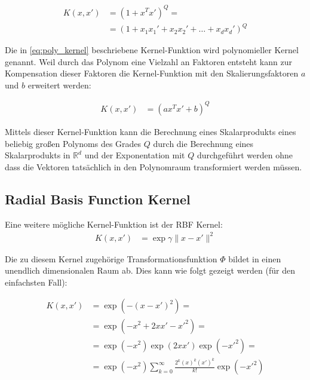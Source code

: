 \documentclass[a4paper,11pt,twoside]{scrreprt}
\newcommand{\norm}[1]{\lVert#1\rVert}
\begin{document}
\begin{equation} \label{eq:poly_kernel}
	\begin{aligned}
		K(x, x') &= (1 + x^{T}x')^{Q} = \\
		&= (1 + x_{1} x_{1}' + x_{2} x_{2}' + \dots + x_{d} x_{d}')^{Q}
	\end{aligned}
\end{equation}

Die in \autoref{eq:poly_kernel} beschriebene Kernel-Funktion wird polynomieller Kernel genannt. Weil durch das Polynom eine Vielzahl an Faktoren entsteht kann zur Kompensation dieser Faktoren die Kernel-Funktion mit den Skalierungsfaktoren $a$ und $b$ erweitert werden:

  \begin{equation} \label{eq:poly_kernel2}
  	\begin{aligned}
  		K(x, x') &= (a x^{T}x' + b)^{Q}
  	\end{aligned}
  \end{equation}

Mittels dieser Kernel-Funktion kann die Berechnung eines Skalarprodukts eines beliebig großen Polynoms des Grades $Q$ durch die Berechnung eines Skalarprodukts in $\mathbb{R}^{d}$ und der Exponentation mit $Q$ durchgeführt werden ohne dass die Vektoren tatsächlich in den Polynomraum transformiert werden müssen.  

\subsection{Radial Basis Function Kernel}

Eine weitere mögliche Kernel-Funktion ist der \ac{RBF} Kernel:
\begin{equation} \label{eq:rbfk}
	\begin{aligned}
		K(x, x') &= \exp{\gamma \norm{x - x'}^2}
	\end{aligned}
\end{equation}

Die zu diesem Kernel zugehörige Transformationsfunktion $\Phi$ bildet in einen unendlich dimensionalen Raum ab. Dies kann wie folgt gezeigt werden (für den einfachsten Fall):

\begin{equation} \label{eq:proof_rbfk_infinite}
	\begin{aligned}
		K(x, x') &= \exp{(-(x - x')^{2})} =\\
		&= \exp{(-x^{2} + 2xx' - x'^{2})} = \\
		&= \exp{(-x^{2})} \exp{(2xx')} \exp{(-x'^{2})} = \\
		&= \exp{(-x^{2})} \sum_{k=0}^{\infty} \frac{2^{k} (x)^{k} (x')^{k}}{k!} \exp{(-x'^{2})}
	\end{aligned}
\end{equation}
\end{document}
